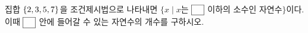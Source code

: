 집합 $\{2{,}\mkern3mu\mathopen{}3{,}\mkern3mu\mathopen{}5{,}\mkern3mu\mathopen{}7\}$을 조건제시법으로 나타내면 $\{x \mid x$는 $\blank$ 이하의 소수인 자연수$\}$이다. 이때 $\blank$ 안에 들어갈 수 있는 자연수의 개수를 구하시오.
